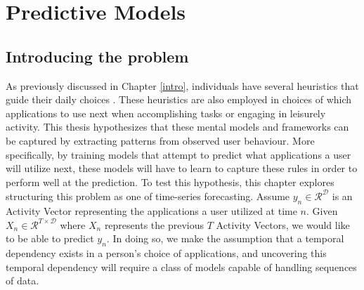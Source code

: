  \chapter{Predictive Models} \label{predmod}
 \section{Introducing the problem}
 As previously discussed in Chapter \ref{intro}, individuals have several heuristics that guide their daily choices \citep{Kahneman1979}. These heuristics are also employed in choices of which applications to use next when accomplishing tasks or engaging in leisurely activity. This thesis hypothesizes that these mental models and frameworks can be captured by extracting patterns from observed user behaviour. More specifically, by training models that attempt to predict what applications a user will utilize next, these models will have to learn to capture these rules in order to perform well at the prediction. To test this hypothesis, this chapter explores structuring this problem as one of time-series forecasting. Assume $y_n \in \mathcal{R}^\mathcal{D} $ is an Activity Vector representing the applications a user utilized at time $n$. Given $X_n \in \mathcal{R}^{T \times \mathcal{D}}$ where $X_n$ represents the previous $T$ Activity Vectors, we would like to be able to predict $y_n$. In doing so, we make the assumption that a temporal dependency exists in a person's choice of applications, and uncovering this temporal dependency will require a class of models capable of handling sequences of data.

